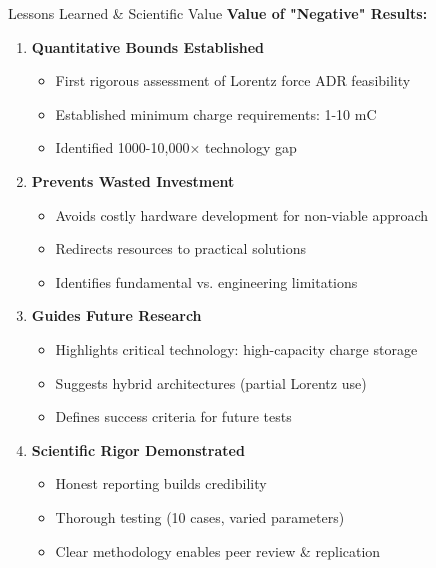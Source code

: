 \documentclass[aspectratio=169]{beamer}
\begin{document}
\begin{frame}{Lessons Learned \& Scientific Value}
\textbf{Value of "Negative" Results:}

\begin{enumerate}
    \item \textbf{Quantitative Bounds Established}
    \begin{itemize}
        \item First rigorous assessment of Lorentz force ADR feasibility
        \item Established minimum charge requirements: 1-10 mC
        \item Identified 1000-10,000× technology gap
    \end{itemize}

    \vspace{0.2cm}
    \item \textbf{Prevents Wasted Investment}
    \begin{itemize}
        \item Avoids costly hardware development for non-viable approach
        \item Redirects resources to practical solutions
        \item Identifies fundamental vs. engineering limitations
    \end{itemize}

    \vspace{0.2cm}
    \item \textbf{Guides Future Research}
    \begin{itemize}
        \item Highlights critical technology: high-capacity charge storage
        \item Suggests hybrid architectures (partial Lorentz use)
        \item Defines success criteria for future tests
    \end{itemize}

    \vspace{0.2cm}
    \item \textbf{Scientific Rigor Demonstrated}
    \begin{itemize}
        \item Honest reporting builds credibility
        \item Thorough testing (10 cases, varied parameters)
        \item Clear methodology enables peer review \& replication
    \end{itemize}
\end{enumerate}
\end{frame}
\end{document}
